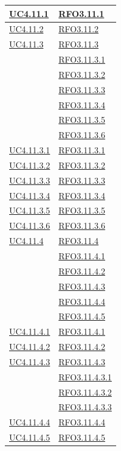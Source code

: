 \begin{longtable}{|>{\centering}m{5cm}|m{5cm}<{\centering}|}
\hyperref[UC4.11.1]{UC4.11.1} & \hyperlink{RFO3.11.1}{RFO3.11.1}\\ \hline
\hyperref[UC4.11.2]{UC4.11.2} & \hyperlink{RFO3.11.2}{RFO3.11.2}\\ \hline
\hyperref[UC4.11.3]{UC4.11.3} & \hyperlink{RFO3.11.3}{RFO3.11.3}\\ & \hyperlink{RFO3.11.3.1}{RFO3.11.3.1}\\
& \hyperlink{RFO3.11.3.2}{RFO3.11.3.2}\\
& \hyperlink{RFO3.11.3.3}{RFO3.11.3.3}\\
& \hyperlink{RFO3.11.3.4}{RFO3.11.3.4}\\
& \hyperlink{RFO3.11.3.5}{RFO3.11.3.5}\\
& \hyperlink{RFO3.11.3.6}{RFO3.11.3.6}\\ \hline

\hyperref[UC4.11.3.1]{UC4.11.3.1} & \hyperlink{RFO3.11.3.1}{RFO3.11.3.1}\\ \hline
\hyperref[UC4.11.3.2]{UC4.11.3.2} & \hyperlink{RFO3.11.3.2}{RFO3.11.3.2}\\ \hline
\hyperref[UC4.11.3.3]{UC4.11.3.3} & \hyperlink{RFO3.11.3.3}{RFO3.11.3.3}\\ \hline
\hyperref[UC4.11.3.4]{UC4.11.3.4} & \hyperlink{RFO3.11.3.4}{RFO3.11.3.4}\\ \hline
\hyperref[UC4.11.3.5]{UC4.11.3.5} & \hyperlink{RFO3.11.3.5}{RFO3.11.3.5}\\ \hline
\hyperref[UC4.11.3.6]{UC4.11.3.6} & \hyperlink{RFO3.11.3.6}{RFO3.11.3.6}\\ \hline

\hyperref[UC4.11.4]{UC4.11.4} & \hyperlink{RFO3.11.4}{RFO3.11.4}\\ & \hyperlink{RFO3.11.4.1}{RFO3.11.4.1}\\
& \hyperlink{RFO3.11.4.2}{RFO3.11.4.2}\\
& \hyperlink{RFO3.11.4.3}{RFO3.11.4.3}\\
& \hyperlink{RFO3.11.4.4}{RFO3.11.4.4}\\
& \hyperlink{RFO3.11.4.5}{RFO3.11.4.5}\\ \hline

\hyperref[UC4.11.4.1]{UC4.11.4.1} & \hyperlink{RFO3.11.4.1}{RFO3.11.4.1}\\ \hline
\hyperref[UC4.11.4.2]{UC4.11.4.2} & \hyperlink{RFO3.11.4.2}{RFO3.11.4.2}\\ \hline
\hyperref[UC4.11.4.3]{UC4.11.4.3} & \hyperlink{RFO3.11.4.3}{RFO3.11.4.3}\\
& \hyperlink{RFO3.11.4.3.1}{RFO3.11.4.3.1}\\
& \hyperlink{RFO3.11.4.3.2}{RFO3.11.4.3.2}\\
& \hyperlink{RFO3.11.4.3.3}{RFO3.11.4.3.3}\\ \hline
\hyperref[UC4.11.4.4]{UC4.11.4.4} & \hyperlink{RFO3.11.4.4}{RFO3.11.4.4}\\ \hline
\hyperref[UC4.11.4.5]{UC4.11.4.5} & \hyperlink{RFO3.11.4.5}{RFO3.11.4.5}\\ \hline


\end{longtable}
